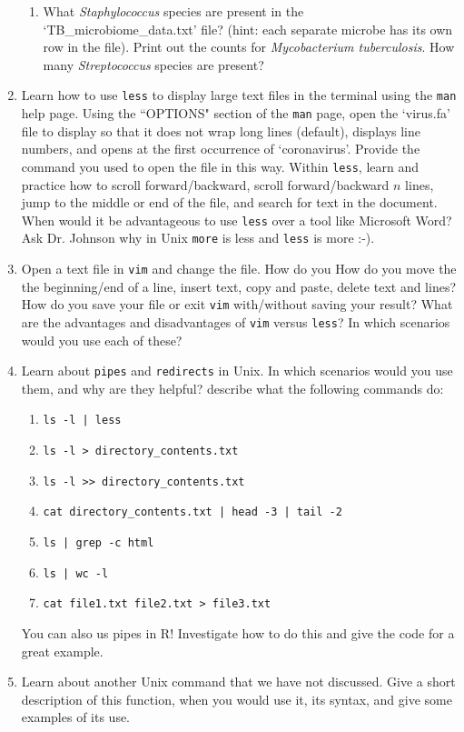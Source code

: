 \documentclass[
]{article}
\begin{document}
\begin{enumerate}
\begin{enumerate}
        \item What {\it Staphylococcus} species are present in the `TB\_microbiome\_data.txt' file? (hint: each separate microbe has its own row in the file). Print out the counts for {\it Mycobacterium tuberculosis}. How many {\it Streptococcus} species are present? 
        \end{enumerate}
    \item Learn how to use \texttt{less} to display large text files in the terminal using the \texttt{man} help page. Using the ``OPTIONS" section of the \texttt{man} page, open the `virus.fa' file to display so that it does not wrap long lines (default), displays line numbers, and opens at the first occurrence of `coronavirus'. Provide the command you used to open the file in this way. Within \texttt{less}, learn and practice how to scroll forward/backward, scroll forward/backward $n$ lines, jump to the middle or end of the file, and search for text in the document. When would it be advantageous to use \texttt{less} over a tool like Microsoft Word? Ask Dr. Johnson why in Unix \texttt{more} is less and \texttt{less} is more :-). 
    \item Open a text file in \texttt{vim} and change the file. How do you How do you move the the beginning/end of a line, insert text, copy and paste, delete text and lines? How do you save your file or exit \texttt{vim} with/without saving your result? What are the advantages and disadvantages of \texttt{vim} versus \texttt{less}? In which scenarios would you use each of these? 
    \item Learn about \texttt{pipes} and \texttt{redirects} in Unix. In which scenarios would you use them, and why are they helpful? describe what the following commands do: 
    \begin{enumerate}
        \item \texttt{ls -l | less}
        \item \texttt{ls -l > directory\_contents.txt}
        \item \texttt{ls -l >> directory\_contents.txt}
        \item \texttt{cat directory\_contents.txt | head -3 | tail -2}
        \item \texttt{ls | grep -c html}
        \item \texttt{ls | wc -l}
        \item \texttt{cat file1.txt file2.txt > file3.txt}
    \end{enumerate}
    You can also us pipes in R! Investigate how to do this and give the code for a great example. 
    \item Learn about another Unix command that we have not discussed. Give a short description of this function, when you would use it, its syntax, and give some examples of its use.
\end{enumerate}
\end{document}
